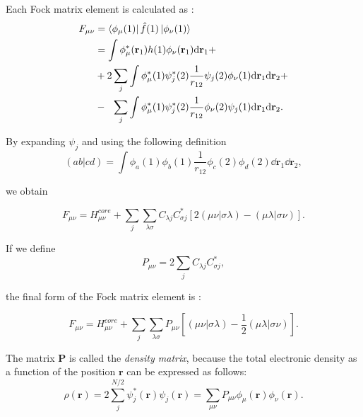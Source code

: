 \documentclass[a4paper,12pt]{article}
\begin{document}
Each Fock matrix element is calculated as :
\begin{align}
	F_{\mu \nu} & = \bra{\phi_{\mu}(1)}\hat{f}(1)\ket{\phi_{\nu}(1)}  \\
	& = \int \phi_{\mu}^*(\mathbf{r}_1) h(1) \phi_{\nu}(\mathbf{r}_1) \dd\mathbf{r}_1 + \\
	&  + 2 \sum_{j} \int \phi_{\mu}^*(1) \psi_{j}^*(2) \frac{1}{r_{12}} \psi_{j}(2) \phi_{\nu}(1) \dd\mathbf{r}_1  \dd\mathbf{r}_2  + \\
	&  - ~~ \sum_{j} \int \phi_{\mu}^*(1) \psi_{j}^*(2) \frac{1}{r_{12}} \phi_{\nu}(2) \psi_{j}(1)  \dd\mathbf{r}_1 \dd\mathbf{r}_2.
\end{align}

By expanding $\psi_j$ and using the following definition \cite[p.295,296]{Atkins} \cite[p.141	]{Attila}
\begin{equation}
	(ab|cd) = \int \phi_a(1) \phi_b(1) \frac{1}{r_{12}}  \phi_c(2) \phi_d(2) \dd\mathbf{r}_1 \dd\mathbf{r}_2,
\end{equation}

we obtain 

\begin{equation}\label{eq:FockElement}
	F_{\mu \nu} = H_{\mu \nu}^{core} +
		\sum_{j} \sum_{\lambda \sigma} C_{\lambda j} C_{\sigma j}^* \left[ 2(\mu \nu | \sigma \lambda) - (\mu \lambda | \sigma \nu)   \right].
\end{equation}

If we define \cite[p.139]{Attila}
\begin{equation}
	P_{\mu \nu} = 2 \sum_{j} C_{\lambda j} C_{\sigma j}^* ,
\end{equation}

the final form of the Fock matrix element is :

\begin{equation} \label{eq:fockElement}
F_{\mu \nu} = H_{\mu \nu}^{core} +
		\sum_{j} \sum_{\lambda \sigma} P_{\mu \nu} \left[ (\mu \nu | \sigma \lambda) - \frac{1}{2} (\mu \lambda | \sigma \nu)   \right].
\end{equation}

The matrix $\mathbf{P}$ is called the \textit{density matrix}, because the total electronic density as a function of the position $\mathbf{r}$ can be expressed as follows:
\begin{equation}\label{eq:densityDef}
\rho (\mathbf{r}) = 2 \sum_{j}^{N/2} \psi_{j}^*(\mathbf{r}) \psi_{j}(\mathbf{r}) = \sum_{\mu \nu} P_{\mu \nu} \phi_{\mu}(\mathbf{r}) \phi_{\nu}(\mathbf{r}).
\end{equation}
\end{document}
